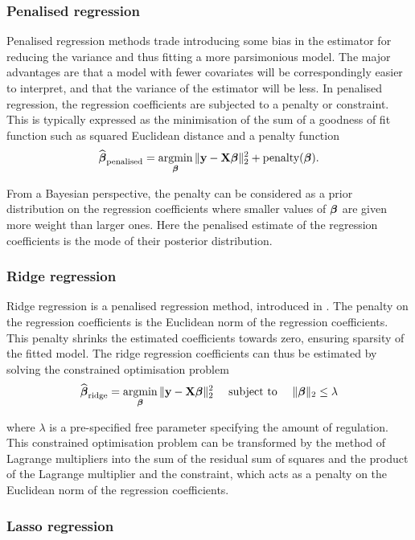 \subsubsection{Penalised regression}

Penalised regression methods trade introducing some bias in the estimator for
reducing the variance and thus fitting a more parsimonious model. The major
advantages are that a model with fewer covariates will be correspondingly easier
to interpret, and that the variance of the estimator will be less. In penalised
regression, the regression coefficients are subjected to a penalty or
constraint. This is typically expressed as the minimisation of the sum of a
goodness of fit function such as squared Euclidean distance and a penalty
function
$$
\widehat{\vbeta}_{\text{penalised}} = \argmin_\vbeta \|\vy - \mX \vbeta\|_2^2 + \text{penalty}(\vbeta).
$$

From a Bayesian perspective, the penalty can be considered as a prior
distribution on the regression coefficients where smaller values of ${\boldsymbol \beta}$ are
given more weight than larger ones. Here the penalised estimate of the
regression coefficients is the mode of their posterior distribution.

\subsubsection{Ridge regression}

Ridge regression is a penalised regression method, introduced in
\cite{Hoerl1970}. The penalty on the regression coefficients is the Euclidean
norm of the regression coefficients. This penalty shrinks the estimated
coefficients towards zero, ensuring sparsity of the fitted model. The ridge
regression coefficients can thus be estimated by solving the constrained
optimisation problem
$$
\widehat{\vbeta}_{\text{ridge}} = \argmin_\vbeta \|\vy - \mX \vbeta\|_2^2 \quad \text{ subject to } \quad \|\vbeta\|_2 \leq \lambda
$$

\noindent 
where $\lambda$ is a pre-specified free parameter specifying the amount of
regulation. This constrained optimisation problem can be transformed by the
method of Lagrange multipliers into the sum of the residual sum of squares and
the product of the Lagrange multiplier and the constraint, which acts as a
penalty on the Euclidean norm of the regression coefficients.


\subsubsection{Lasso regression}

